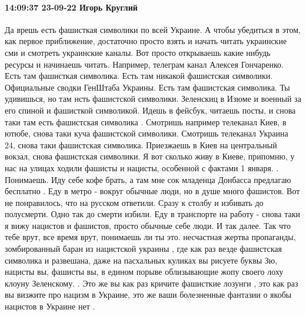  
 
 
 
 

\paragraph{14:09:37 23-09-22 Игорь Круглий}

Да врешь есть фашисткая символики по всей Украине. А чтобы убедиться в
этом, как первое приближение, достаточно просто взять и начать читать украинские сми и
смотреть украинские каналы. Вот просто открываешь какие нибудь ресурсы и
начинаешь читать. Например, телеграм канал Алексея Гончаренко. Есть там
фашисткая символика. Есть там никакой фашистская символики. Официальные сводки
ГенШтаба Украины. Есть там фашистская символика. Ты удивишься, но там нсть
фашистской символики. Зеленскиц в Изюме и военный за его спиной и фашисткой символикой. Идешь в фейсбук, читаешь посты, и снова таки там есть
фашистская символика . Смотришь например телеканал Киев, в ютюбе, снова таки
куча фашистской символики. Смотришь
телеканал Украина 24, снова таки фашистская символика. Приезжаешь в
Киев на центральный вокзал, снова фашистская символики. Я вот
сколько живу в Киеве, припомню, у нас на улицах ходили фашисты и
нацисты, особенной с фактами 1 января. . Понимаешь. Иду себе кофе брать, а там мне сок младенца Донбасса предлагаю бесплатно . Еду в метро - вокруг
обычные люди, но в душе много фашистов. Вот не понравилось, что на русском ответили. Сразу к столбу и избивать до полусмерти. Одно так до смерти избили. Еду в транспорте на работу - снова таки я вижу нацистов и фашистов, просто обычные себе люди. И так далее. Так что
тебе врут, все время врут, понимаешь ли ты это. несчастная жертва пропаганды,
зомбированный баран из нацистской украины , где как раз везде фашистская символика
и развешана, даже на пасхальных куликах вы рисуете буквы Зю, нацисты вы,
фашисты вы, в едином порыве облизывающие жопу своего лоху клоуну Зеленскому. .
Это же вы как раз кричите фашисткие лозунги , это как раз вы визжите про нацизм в
Украине, это же ваши болезненные фантазии о якобы нацистов в Украине нет .
